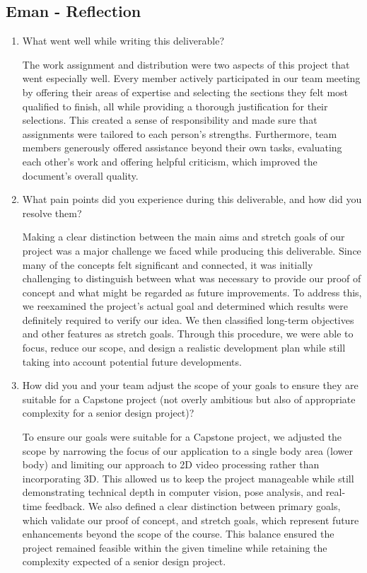 \documentclass{article}
\begin{document}
\subsection*{Eman - Reflection}
\begin{enumerate}
    \item What went well while writing this deliverable? 

    The work assignment and distribution were two aspects of this project that went especially well. Every member actively
    participated in our team meeting by offering their areas of expertise and selecting the sections they felt most qualified
    to finish, all while providing a thorough justification for their selections. This created a sense of responsibility and
    made sure that assignments were tailored to each person's strengths. Furthermore, team members generously offered
    assistance beyond their own tasks, evaluating each other's work and offering helpful criticism, which improved the
    document's overall quality.

    \item What pain points did you experience during this deliverable, and how
    did you resolve them?

    Making a clear distinction between the main aims and stretch goals of our project was a major challenge we faced while
    producing this deliverable. Since many of the concepts felt significant and connected, it was initially challenging to
    distinguish between what was necessary to provide our proof of concept and what might be regarded as future improvements.
    To address this, we reexamined the project's actual goal and determined which results were definitely required to verify
    our idea. We then classified long-term objectives and other features as stretch goals. Through this procedure, we were
    able to focus, reduce our scope, and design a realistic development plan while still taking into account potential
    future developments.

    \item How did you and your team adjust the scope of your goals to ensure
    they are suitable for a Capstone project (not overly ambitious but also of
    appropriate complexity for a senior design project)?

    To ensure our goals were suitable for a Capstone project, we adjusted the scope by narrowing the focus of our application
    to a single body area (lower body) and limiting our approach to 2D video processing rather than incorporating 3D. This
    allowed us to keep the project manageable while still demonstrating technical depth in computer vision, pose analysis,
    and real-time feedback. We also defined a clear distinction between primary goals, which validate our proof of concept,
    and stretch goals, which represent future enhancements beyond the scope of the course. This balance ensured the project
    remained feasible within the given timeline while retaining the complexity expected of a senior design project.
    
\end{enumerate}  
\end{document}
